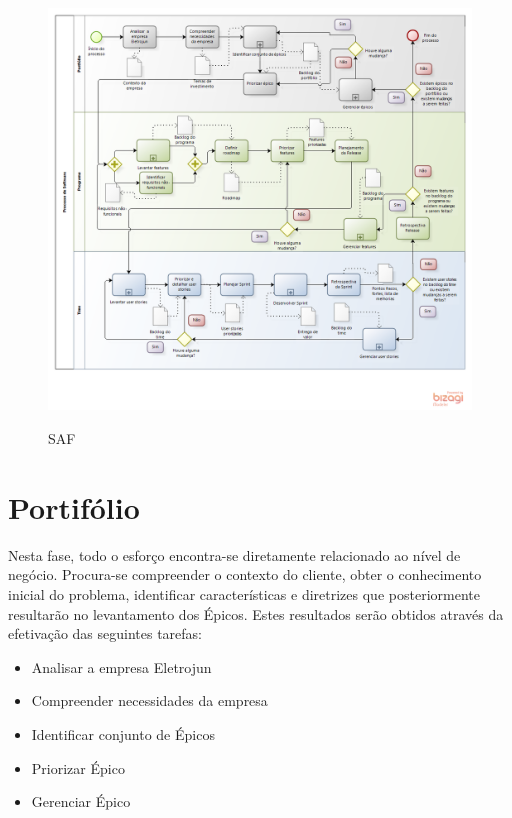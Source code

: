 \FloatBarrier
\begin{figure}[!htpd]
		\centering
		\caption{SAF}
		\includegraphics[scale=0.27]{figuras/Eletrojun}
		\label{img:SAF}
\end{figure}
\FloatBarrier

\section {Portifólio}

Nesta fase, todo o esforço encontra-se diretamente relacionado ao nível de negócio. Procura-se compreender o contexto do cliente, obter o conhecimento inicial do problema, identificar características e diretrizes que posteriormente  resultarão no levantamento dos Épicos.  Estes resultados serão obtidos através da efetivação das seguintes tarefas:

\begin{itemize}
\item Analisar a empresa Eletrojun
\item Compreender necessidades da empresa
\item Identificar conjunto de Épicos
\item Priorizar Épico
\item Gerenciar Épico
\end{itemize}

